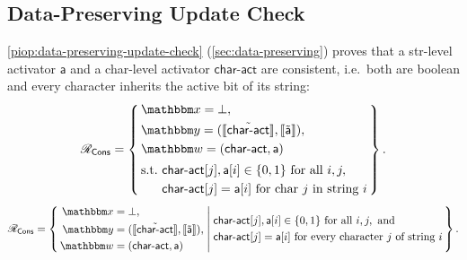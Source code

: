 \subsection{Data-Preserving Update Check}
\label{sec:proof-cons}
\cref{piop:data-preserving-update-check} (\cref{sec:data-preserving}) proves that a str-level activator $\mathsf{a}$ and a char-level activator $\mathsf{char\text{-}act}$ are consistent, i.e.\ both are boolean and every character inherits the active bit of its string:
\ifsp
\begin{displaymath}
\NPRelation_{\mathsf{Cons}} = \left\{\,
  \begin{aligned}
    & \NPInstance = \bot,\\
    & \NPInstancey = (\Oracle{\MLE{\mathsf{char\text{-}act}}}, \Oracle{\MLE{\mathsf{a}}}),\\
    & \NPWitness = (\mathsf{char\text{-}act}, \mathsf{a})\\[2pt]
    & \text{s.t.}\ \mathsf{char\text{-}act}[j], \mathsf{a}[i] \in \{0,1\}\ \text{for all } i,j,\\
    & \phantom{\text{s.t.}}\ \mathsf{char\text{-}act}[j] = \mathsf{a}[i]\ \text{for char } j \text{ in string } i
  \end{aligned}
\,\right\}.
\end{displaymath}
\else
\begin{displaymath}
\NPRelation_{\mathsf{Cons}} = \left\{\,
  \begin{aligned}
  \NPInstance &= \bot,\\
  \NPInstancey &= (\Oracle{\MLE{\mathsf{char\text{-}act}}}, \Oracle{\MLE{\mathsf{a}}}),\\
  \NPWitness &= (\mathsf{char\text{-}act}, \mathsf{a})
  \end{aligned}
  \;\middle|\;
  \begin{aligned}
    & \mathsf{char\text{-}act}[j], \mathsf{a}[i] \in \{0,1\}\ \text{for all } i,j,\ \text{and} \\
    & \mathsf{char\text{-}act}[j] = \mathsf{a}[i]\ \text{for every character } j \text{ of string } i
  \end{aligned}
\,\right\}.
\end{displaymath}
\fi
{}

